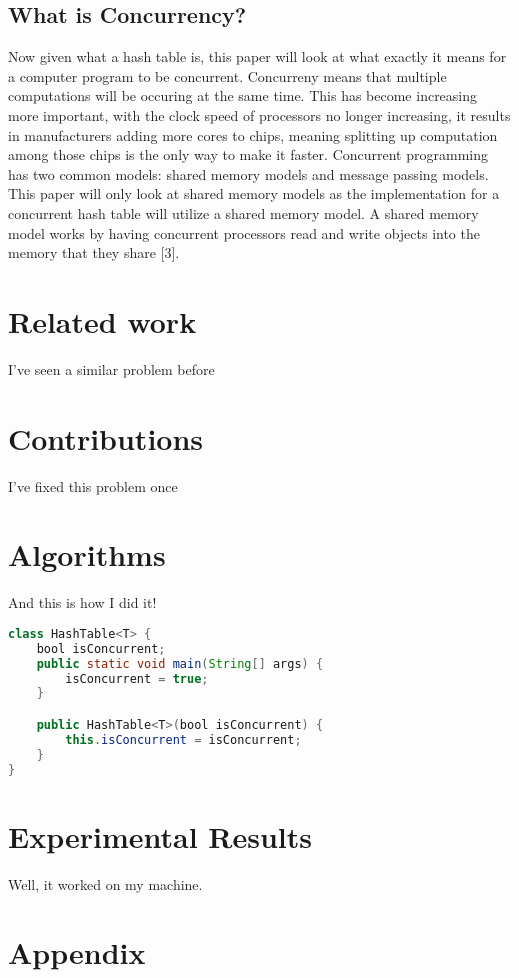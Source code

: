 \documentclass[conference]{IEEEtran}
\begin{document}
\subsection{What is Concurrency?}
Now given what a hash table is, this paper will look at what exactly it means for a computer program to be concurrent. Concurreny means that multiple computations
will be occuring at the same time. This has become increasing more important, with the clock speed of processors no longer increasing, it results in 
manufacturers adding more cores to chips, meaning splitting up computation among those chips is the only way to make it faster. Concurrent programming
has two common models: shared memory models and message passing models. This paper will only look at shared memory models as the implementation for
a concurrent hash table will utilize a shared memory model. A shared memory model works by having concurrent processors read and write objects into the
memory that they share [3].

\section{Related work}
I've seen a similar problem before

\section{Contributions}
I've fixed this problem once

\section{Algorithms}
And this is how I did it!
\begin{lstlisting}[language={Java},caption=Testing surce code in \LaTeX{}.,breaklines=true,frame=single]
class HashTable<T> {
    bool isConcurrent;
    public static void main(String[] args) {
        isConcurrent = true;
    }

    public HashTable<T>(bool isConcurrent) {
        this.isConcurrent = isConcurrent;
    }
}
\end{lstlisting}

\section{Experimental Results}
Well, it worked on my machine.

\section{Appendix}
\end{document}
